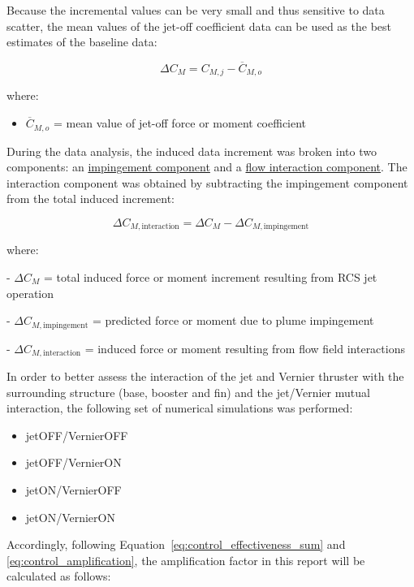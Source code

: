 \documentclass[12pt]{article}
\begin{document}
Because the incremental values can be very small and thus sensitive to data scatter, the mean values of the jet-off coefficient data can be used as the best estimates of the baseline data:

\begin{equation}
    \Delta C_M = C_{M,j} - \overline{C}_{M,o}
\end{equation}

where:

\begin{itemize}
    \item $\overline{C}_{M,o}$ = mean value of jet-off force or moment coefficient
\end{itemize}    

During the data analysis, the induced data increment was broken into two components: an \ul{impingement component} and a \ul{flow interaction component}. The interaction component was obtained by subtracting the impingement component from the total induced increment:

\begin{equation}
    \Delta C_{M,\text{interaction}} = \Delta C_{M} - \Delta C_{M,\text{impingement}}
    \label{eq:interaction-component}
\end{equation}

where:
    
- $\Delta C_{M}$ = total induced force or moment increment resulting from RCS jet operation
    
- $\Delta C_{M,\text{impingement}}$ = predicted force or moment due to plume impingement
    
- $\Delta C_{M,\text{interaction}}$ = induced force or moment resulting from flow field interactions

In order to better assess the interaction of the jet and Vernier thruster with the surrounding structure (base, booster and fin) and the jet/Vernier mutual interaction, the following set of numerical simulations was performed:

\begin{itemize}
    \item jetOFF/VernierOFF 
    \item jetOFF/VernierON  
    \item jetON/VernierOFF  
    \item jetON/VernierON   
\end{itemize}

Accordingly, following Equation~\ref{eq:control_effectiveness_sum} and \ref{eq:control_amplification}, the amplification factor in this report will be calculated as follows:
\end{document}
